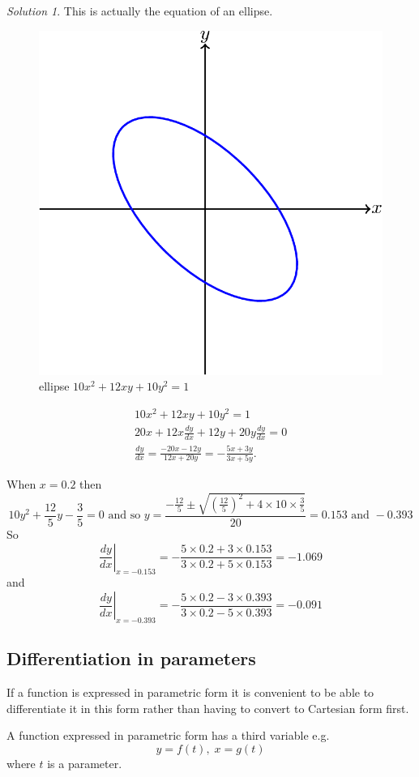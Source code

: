 \documentclass[
  11pt,
  oneside]{book}
\newcommand{\slide}{}
\theoremstyle{definition}
\theoremstyle{definition}
\theoremstyle{definition}
\theoremstyle{definition}
\theoremstyle{remark}
\newtheorem*{solution}{Solution}
\begin{document}
\begin{solution}
This is actually the equation of an ellipse.

\begin{figure}

{\centering \includegraphics[width=0.4\linewidth]{tikztopng-figure32} 

}

\caption{ellipse $10x^2 + 12xy + 10y^2 = 1$}\label{fig:unnamed-chunk-31}
\end{figure}

\begin{gather*}
10x^2 + 12xy + 10y^2 = 1\\
20x+12x\frac{dy}{dx}+12y+20y\frac{dy}{dx}=0\\
\frac{dy}{dx} = \frac{-20x-12y}{12x+20y} = -\frac{5x+3y}{3x+5y}.
\end{gather*}

When \(x=0.2\) then
\[
10y^2+\frac{12}5y-\frac35=0\text{ and so }y = \frac{-\frac{12}5\pm\sqrt{\left(\frac{12}5\right)^2+4\times10\times\frac35}}{20} = 0.153\text{ and }-0.393
\]
So
\[
\left.\frac{dy}{dx}\right|_{x=-0.153} = -\frac{5\times0.2+3\times 0.153}{3\times0.2+5\times0.153} = -1.069
\]
and
\[
\left.\frac{dy}{dx}\right|_{x=-0.393} = -\frac{5\times0.2-3\times 0.393}{3\times0.2-5\times0.393} = -0.091
\]
\end{solution}

\slide

\subsection{Differentiation in parameters}\label{differentiation-in-parameters}

If a function is expressed in parametric form it is convenient to be able to differentiate it in this form rather than having to convert to Cartesian form first.

A function expressed in parametric form has a third variable e.g.
\[
y = f(t),\; x = g(t)
\]
where \(t\) is a parameter.
\end{document}
